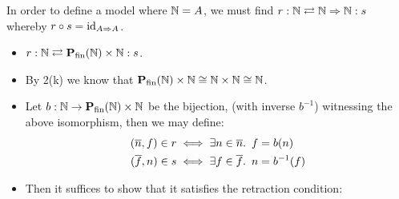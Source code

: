In order to define a model where $\mathbb{N} = A$, we must find ${r : \mathbb{N}\rightleftarrows\mathbb{N}\Rightarrow\mathbb{N} : s}$ whereby $r\circ s = \operatorname{id}_{A\Rightarrow A}$.
\begin{itemize}
  \item[\iffs] $r : \mathbb{N} \rightleftarrows\mathbf{P}_{\operatorname{fin}}(\mathbb{N})\times\mathbb{N} : s$.
  \item[\phantom{\imps}] By 2(k) we know that $\mathbf{P}_{\operatorname{fin}}(\mathbb{N})\times\mathbb{N}\cong\mathbb{N}\times\mathbb{N}\cong\mathbb{N}$.

  \item[\phantom{\imps}] Let ${b : \mathbb{N}\to\mathbf{P}_{\operatorname{fin}}(\mathbb{N})\times\mathbb{N}}$ be the bijection, (with inverse $b^{-1}$) witnessing the above isomorphism, then we may define:
    \begin{align*}
      (\overline{n},f)\in r & \iff\exists n\in\overline{n}\ldotp~f = b(n)\\
      (\overline{f},n)\in s & \iff\exists f\in\overline{f}\ldotp~n = b^{-1}(f)\\
    \end{align*}

    \item[\phantom{\imps}]
      Then it suffices to show that it satisfies the retraction condition:
\end{itemize}
